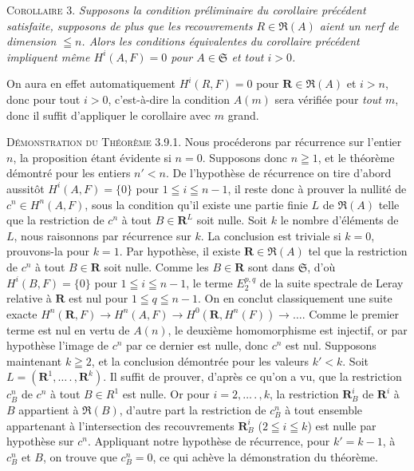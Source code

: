 
\textsc{Corollaire 3.} \textit{Supposons la condition préliminaire du
corollaire précédent satisfaite, supposons de plus que les recouvrements
$R\in\mathfrak R(A)$ aient un nerf de dimension $\leqq n$. Alors les
conditions équivalentes du corollaire précédent impliquent même
$H^i(A,F)=0$ pour $A\in\mathfrak S$ et tout $i>0$.}

On aura en effet automatiquement $H^i(R,F)=0$ pour
$\mathbf R\in\mathfrak R(A)$ et $i>n$, donc pour tout $i>0$, c'est-à-dire la
condition $A(m)$ sera vérifiée pour \emph{tout $m$}, donc il suffit d'appliquer le
corollaire avec $m$ grand.

\textsc{Démonstration du Théorème 3.9.1.} Nous procéderons par
récurrence sur l'entier $n$, la proposition étant évidente si $n=0$.
Supposons donc $n\geqq1$, et le théorème démontré pour les entiers $n'<n$. De
l'hypothèse de récurrence on tire d'abord aussitôt $H^i(A,F)=\{0\}$ pour
$1\leqq i\leqq n-1$, il reste donc à prouver la nullité de
$c^n\in H^n(A,F)$, sous la condition qu'il existe une partie finie $L$ de
$\mathfrak R(A)$ telle que la restriction de $c^n$ à tout
$B\in\mathbf R^L$ soit nulle. Soit $k$ le nombre d'éléments de $L$, nous
raisonnons par récurrence sur $k$. La conclusion est triviale si $k=0$,
prouvons-la pour $k=1$.
Par hypothèse, il existe $\mathbf R\in\mathfrak R(A)$ tel que la restriction
de $c^n$ à tout $B\in\mathbf R$ soit nulle. Comme les $B\in\mathbf R$ sont
dans $\mathfrak S$, d'où $H^i(B,F)=\{0\}$ pour $1\leqq i\leqq n-1$, le terme
$E_2^{p,q}$ de la suite spectrale de Leray relative à $\mathbf R$ est nul pour
$1\leqq q\leqq n-1$. On en conclut classiquement une suite exacte
$H^n(\mathbf R,F)\to H^n(A,F)
\to H^0(\mathbf R,H^n(F))\to\ldots$.
Comme le premier terme est nul en vertu de $A(n)$, le deuxième homomorphisme
est injectif, or par hypothèse l'image de $c^n$ par ce dernier est nulle, donc
$c^n$ est nul.
Supposons maintenant $k\geqq2$, et la conclusion démontrée pour les valeurs
$k'<k$. Soit $L=(\mathbf R^1,\ldots\mathpunct{.},\mathbf R^k)$. Il suffit de prouver,
d'après ce qu'on a vu, que la restriction $c_B^n$ de $c^n$ à tout
$B\in R^1$ est nulle. Or pour $i=2,\ldots\mathpunct{.},k$, la restriction
$\mathbf R_B^i$ de $\mathbf R^i$ à $B$ appartient à $\mathfrak R(B)$,
d'autre part la restriction de $c_B^n$ à tout ensemble appartenant à
l'intersection des recouvrements $\mathbf R_B^i$ ($2\leqq i\leqq k$) est nulle
par hypothèse sur $c^n$. Appliquant notre hypothèse de récurrence, pour
$k'=k-1$, à $c_B^n$ et $B$, on trouve que $c_B^n=0$, ce qui achève la
démonstration du théorème.

